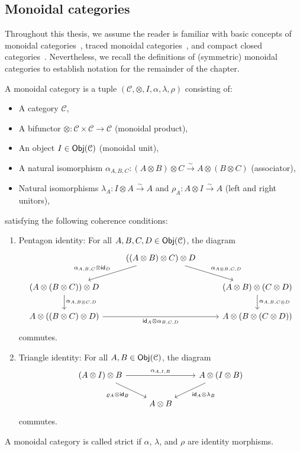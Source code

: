 \subsection{Monoidal categories}\label{c3:subsec:monoidal}
Throughout this thesis, we assume the reader is familiar with basic concepts of monoidal categories~\cite{Selinger_2010,piedeleu2023introduction}, traced monoidal categories~\cite{Joyal:1996:Traced}, and compact closed categories~\cite{kellylaplaza}. Nevertheless, we recall the definitions of (symmetric) monoidal categories to establish notation for the remainder of the chapter.
\begin{definition}
A monoidal category is a tuple $(\mathcal{C}, \otimes, I, \alpha, \lambda, \rho)$ consisting of:
\begin{itemize}
    \item A category $\mathcal{C}$,
    \item A bifunctor $\otimes \colon \mathcal{C} \times \mathcal{C} \to \mathcal{C}$ (monoidal product),
    \item An object $I \in\mathsf{Obj}(\mathcal{C})$ (monoidal unit),
    \item A natural isomorphism $\alpha_{A,B,C} \colon (A \otimes B) \otimes C \xrightarrow{\sim} A \otimes (B \otimes C)$ (associator),
    \item Natural isomorphisms $\lambda_A \colon I \otimes A \xrightarrow{\sim} A$ and $\rho_A \colon A \otimes I \xrightarrow{\sim} A$ (left and right unitors),
\end{itemize}
satisfying the following coherence conditions:
\begin{enumerate}
    \item {Pentagon identity}: For all $A,B,C,D \in \mathsf{Obj}(\mathcal{C})$, the diagram
    \[\begin{tikzcd}
        & ((A \otimes B) \otimes C) \otimes D \arrow[dr, "\alpha_{A\otimes B,C,D}"] \arrow[dl, "\alpha_{A,B,C} \otimes \id_D"'] \\
        (A \otimes (B \otimes C)) \otimes D \arrow[d, "\alpha_{A,B\otimes C,D}"] & & (A \otimes B) \otimes (C \otimes D) \arrow[d, "\alpha_{A,B,C\otimes D}"] \\
        A \otimes ((B \otimes C) \otimes D) \arrow[rr, "\id_A \otimes \alpha_{B,C,D}"'] & & A \otimes (B \otimes (C \otimes D))
    \end{tikzcd}\]
    commutes.
    
    \item {Triangle identity}: For all $A,B \in\mathsf{Obj}(\mathcal{C})$, the diagram
    \[\begin{tikzcd}
        (A \otimes I) \otimes B \arrow[rr, "\alpha_{A,I,B}"] \arrow[dr, "\rho_A \otimes \id_B"'] & & A \otimes (I \otimes B) \arrow[dl, "\id_A \otimes \lambda_B"] \\
        & A \otimes B &
    \end{tikzcd}\]
    commutes.
\end{enumerate}
A monoidal category is called {strict} if $\alpha$, $\lambda$, and $\rho$ are identity morphisms.
\end{definition}
